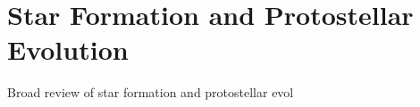 \section{Star Formation and Protostellar Evolution}
Broad review of star formation and protostellar evol